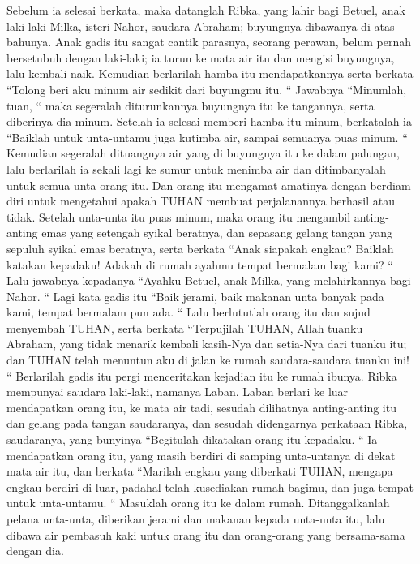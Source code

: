 \begin{biblechapter}
\verse Sebelum ia selesai berkata, maka datanglah Ribka, yang lahir bagi Betuel, anak laki-laki Milka, isteri Nahor, saudara Abraham; buyungnya dibawanya di atas bahunya.
\verse Anak gadis itu sangat cantik parasnya, seorang perawan, belum pernah bersetubuh dengan laki-laki; ia turun ke mata air itu dan mengisi buyungnya, lalu kembali naik.
\verse Kemudian berlarilah hamba itu mendapatkannya serta berkata “Tolong beri aku minum air sedikit dari buyungmu itu. “
\verse Jawabnya “Minumlah, tuan, “ maka segeralah diturunkannya buyungnya itu ke tangannya, serta diberinya dia minum.
\verse Setelah ia selesai memberi hamba itu minum, berkatalah ia “Baiklah untuk unta-untamu juga kutimba air, sampai semuanya puas minum. “
\verse Kemudian segeralah dituangnya air yang di buyungnya itu ke dalam palungan, lalu berlarilah ia sekali lagi ke sumur untuk menimba air dan ditimbanyalah untuk semua unta orang itu.
\verse Dan orang itu mengamat-amatinya dengan berdiam diri untuk mengetahui apakah TUHAN membuat perjalanannya berhasil atau tidak.
\verse Setelah unta-unta itu puas minum, maka orang itu mengambil anting-anting emas yang setengah syikal beratnya, dan sepasang gelang tangan yang sepuluh syikal emas beratnya,
\verse serta berkata “Anak siapakah engkau? Baiklah katakan kepadaku! Adakah di rumah ayahmu tempat bermalam bagi kami? “
\verse Lalu jawabnya kepadanya “Ayahku Betuel, anak Milka, yang melahirkannya bagi Nahor. “
\verse Lagi kata gadis itu “Baik jerami, baik makanan unta banyak pada kami, tempat bermalam pun ada. “
\verse Lalu berlututlah orang itu dan sujud menyembah TUHAN,
\verse serta berkata “Terpujilah TUHAN, Allah tuanku Abraham, yang tidak menarik kembali kasih-Nya dan setia-Nya dari tuanku itu; dan TUHAN telah menuntun aku di jalan ke rumah saudara-saudara tuanku ini! “
\verse Berlarilah gadis itu pergi menceritakan kejadian itu ke rumah ibunya.
\verse Ribka mempunyai saudara laki-laki, namanya Laban. Laban berlari ke luar mendapatkan orang itu, ke mata air tadi,
\verse sesudah dilihatnya anting-anting itu dan gelang pada tangan saudaranya, dan sesudah didengarnya perkataan Ribka, saudaranya, yang bunyinya “Begitulah dikatakan orang itu kepadaku. “ Ia mendapatkan orang itu, yang masih berdiri di samping unta-untanya di dekat mata air itu,
\verse dan berkata “Marilah engkau yang diberkati TUHAN, mengapa engkau berdiri di luar, padahal telah kusediakan rumah bagimu, dan juga tempat untuk unta-untamu. “
\verse Masuklah orang itu ke dalam rumah. Ditanggalkanlah pelana unta-unta, diberikan jerami dan makanan kepada unta-unta itu, lalu dibawa air pembasuh kaki untuk orang itu dan orang-orang yang bersama-sama dengan dia.

\end{biblechapter}
